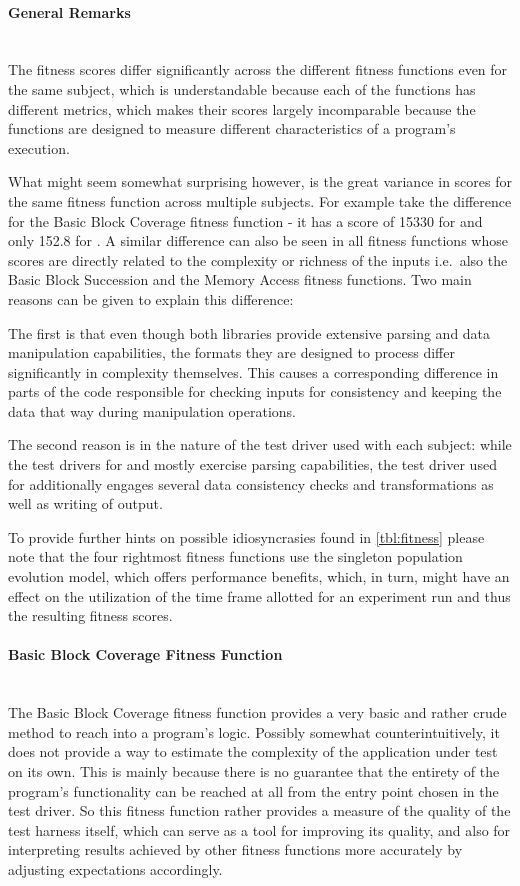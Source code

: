 \paragraph{General Remarks} ~\\
The fitness scores differ significantly across the different fitness functions even for the same subject,
which is understandable because each of the functions has different metrics, which makes their scores
largely incomparable because the functions are designed to measure different characteristics of a
program's execution.

What might seem somewhat surprising however, is the great variance in scores for the same fitness function
across multiple subjects. For example take the difference for the Basic Block Coverage fitness function - it
has a score of 15330 for \libpng and only 152.8 for \libpcap. 
A similar difference can also be seen in all fitness functions whose scores are directly related to the
complexity or richness of the inputs i.e.\ also the Basic Block Succession and the Memory Access fitness
functions. Two main reasons can be given to explain this difference:

The first is that even though both libraries provide extensive parsing and data manipulation capabilities,
the formats they are designed to process differ significantly in complexity themselves. This causes a
corresponding difference in parts of the code responsible for checking inputs for consistency and keeping
the data that way during manipulation operations.

The second reason is in the nature of the test driver used with each subject: while the test drivers for
\libpcap and \libxml mostly exercise parsing capabilities, the test driver used for \libpng additionally
engages several data consistency checks and transformations as well as writing of output.

To provide further hints on possible idiosyncrasies found in \cref{tbl:fitness} please note that the four
rightmost fitness functions use the singleton population evolution model, which offers performance benefits,
which, in turn, might have an effect on the utilization of the time frame allotted for an experiment run and
thus the resulting fitness scores.

\paragraph{Basic Block Coverage Fitness Function} ~\\
The Basic Block Coverage fitness function provides a very basic and rather crude method to reach into a
program's logic. Possibly somewhat counterintuitively, it does not provide a way to estimate the complexity of
the application under test on its own. This is mainly because there is no guarantee that the entirety of
the program's functionality can be reached at all from the entry point chosen in the test driver. So this
fitness function rather provides a measure of the quality of the test harness itself, which can serve as a
tool for improving its quality, and also for interpreting results achieved by other fitness functions more
accurately by adjusting expectations accordingly.

